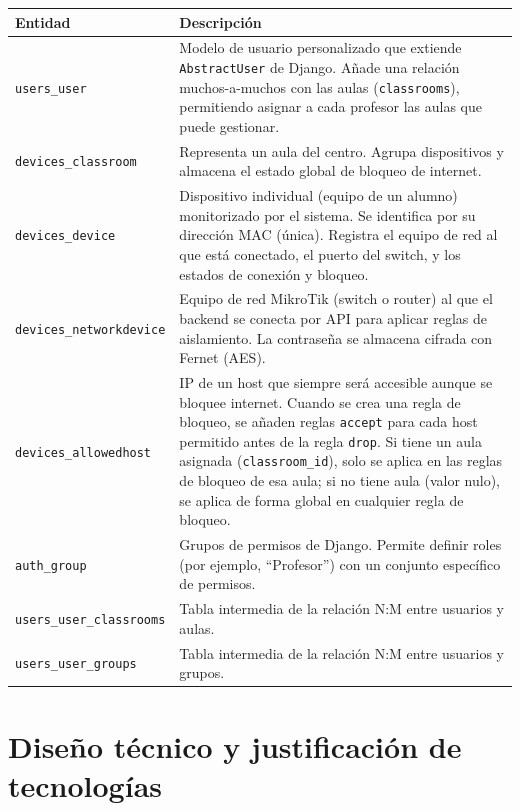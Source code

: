 \documentclass[12pt, a4paper, twoside]{article}
\begin{document}
\begin{longtable}{p{4.5cm}p{10.5cm}}
  \toprule
  \textbf{Entidad} & \textbf{Descripción} \\
  \midrule
  \endhead
  \texttt{users\_user} & Modelo de usuario personalizado que extiende \texttt{AbstractUser} de Django. Añade una relación muchos-a-muchos con las aulas (\texttt{classrooms}), permitiendo asignar a cada profesor las aulas que puede gestionar. \\
  \addlinespace
  \texttt{devices\_classroom} & Representa un aula del centro. Agrupa dispositivos y almacena el estado global de bloqueo de internet. \\
  \addlinespace
  \texttt{devices\_device} & Dispositivo individual (equipo de un alumno) monitorizado por el sistema. Se identifica por su dirección MAC (única). Registra el equipo de red al que está conectado, el puerto del switch, y los estados de conexión y bloqueo. \\
  \addlinespace
  \texttt{devices\_networkdevice} & Equipo de red MikroTik (switch o router) al que el backend se conecta por API para aplicar reglas de aislamiento. La contraseña se almacena cifrada con Fernet (AES). \\
  \addlinespace
  \texttt{devices\_allowedhost} & IP de un host que siempre será accesible aunque se bloquee internet. Cuando se crea una regla de bloqueo, se añaden reglas \texttt{accept} para cada host permitido antes de la regla \texttt{drop}. Si tiene un aula asignada (\texttt{classroom\_id}), solo se aplica en las reglas de bloqueo de esa aula; si no tiene aula (valor nulo), se aplica de forma global en cualquier regla de bloqueo. \\
  \addlinespace
  \texttt{auth\_group} & Grupos de permisos de Django. Permite definir roles (por ejemplo, ``Profesor'') con un conjunto específico de permisos. \\
  \addlinespace
  \texttt{users\_user\_classrooms} & Tabla intermedia de la relación N:M entre usuarios y aulas. \\
  \addlinespace
  \texttt{users\_user\_groups} & Tabla intermedia de la relación N:M entre usuarios y grupos. \\
  \bottomrule
\end{longtable}

\section{Diseño técnico y justificación de tecnologías}
\end{document}

